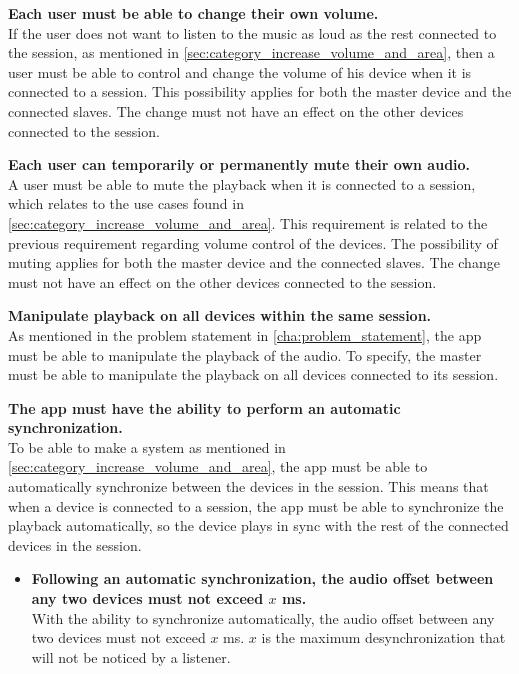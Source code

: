 \begin{eletterate}
    \item \textbf{Each user must be able to change their own volume.} \hfill\\
        If the user does not want to listen to the music as loud as the rest connected to the session, as mentioned in \cref{sec:category_increase_volume_and_area}, 
        then a user must be able to control and change the volume of his device when it is connected to a session.
        This possibility applies for both the master device and the connected slaves.
        The change must not have an effect on the other devices connected to the session.

    \item \textbf{Each user can temporarily or permanently mute their own audio.} \hfill\\
        A user must be able to mute the playback when it is connected to a session, which relates to the use cases found in \cref{sec:category_increase_volume_and_area}.
        This requirement is related to the previous requirement regarding volume control of the devices.
        The possibility of muting applies for both the master device and the connected slaves.
        The change must not have an effect on the other devices connected to the session.
    
    \item \textbf{Manipulate playback on all devices within the same session.} \hfill\\
        As mentioned in the problem statement in \cref{cha:problem_statement}, the app must be able to manipulate the playback of the audio. 
        To specify, the master must be able to manipulate the playback on all devices connected to its session.
    
    \item \textbf{The app must have the ability to perform an automatic synchronization.} \hfill\\
        To be able to make a system as mentioned in \cref{sec:category_increase_volume_and_area}, 
        the app must be able to automatically synchronize between the devices in the session. 
        This means that when a device is connected to a session, the app must be able to synchronize the playback automatically,
        so the device plays in sync with the rest of the connected devices in the session.

    \begin{itemize}
        \item \textbf{Following an automatic synchronization, the audio offset between any two devices must not exceed $x$ ms.} \hfill\\
            With the ability to synchronize automatically, the audio offset between any two devices must not exceed $x$ ms.
            $x$ is the maximum desynchronization that will not be noticed by a listener.


\end{itemize}
\end{eletterate}
